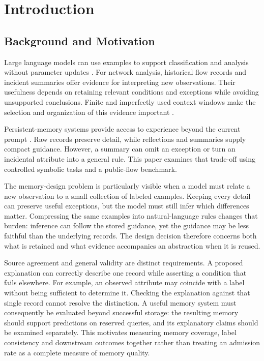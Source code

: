 \documentclass[onecolumn]{IEEEtran}
\numberwithin{equation}{section}
\theoremstyle{definition}
\theoremstyle{remark}
\begin{document}
\section{Introduction}
\subsection{Background and Motivation}
Large language models can use examples to support classification and analysis without parameter updates \cite{brown2020language,lewis2020retrieval}. For network analysis, historical flow records and incident summaries offer evidence for interpreting new observations. Their usefulness depends on retaining relevant conditions and exceptions while avoiding unsupported conclusions. Finite and imperfectly used context windows make the selection and organization of this evidence important \cite{an2024why,liu2024lost}.

Persistent-memory systems provide access to experience beyond the current prompt \cite{packer2023memgpt,wang2023longmem,wang2024memoryllm}. Raw records preserve detail, while reflections and summaries supply compact guidance. However, a summary can omit an exception or turn an incidental attribute into a general rule. This paper examines that trade-off using controlled symbolic tasks and a public-flow benchmark.

The memory-design problem is particularly visible when a model must relate a new observation to a small collection of labeled examples. Keeping every detail can preserve useful exceptions, but the model must still infer which differences matter. Compressing the same examples into natural-language rules changes that burden: inference can follow the stored guidance, yet the guidance may be less faithful than the underlying records. The design decision therefore concerns both what is retained and what evidence accompanies an abstraction when it is reused.

Source agreement and general validity are distinct requirements. A proposed explanation can correctly describe one record while asserting a condition that fails elsewhere. For example, an observed attribute may coincide with a label without being sufficient to determine it. Checking the explanation against that single record cannot resolve the distinction. A useful memory system must consequently be evaluated beyond successful storage: the resulting memory should support predictions on reserved queries, and its explanatory claims should be examined separately. This motivates measuring memory coverage, label consistency and downstream outcomes together rather than treating an admission rate as a complete measure of memory quality.
\end{document}
